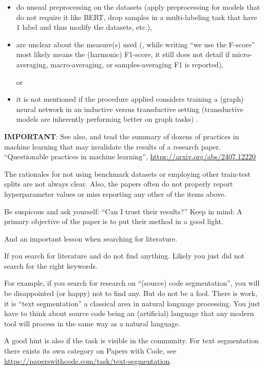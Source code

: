 \documentclass[manuscript, nonacm]{acmart}
\begin{document}
\begin{tcolorbox}[title=Instructions]
\begin{itemize}
\item do unsual preprocessing on the datasets (\eg apply preprocessing for models that do not require it like BERT, drop samples in a multi-labeling task that have $1$ label and thus modify the datasets, etc.),
%

\item are unclear about the measure(s) used (\eg, while writing ``we use the F-score'' most likely means the (harmonic) F1-score, it still does not detail if micro-averaging, macro-averaging, or samples-averaging F1 is reported),
%

or

\item it is not mentioned if the procedure applied considers training a (graph) neural network in an inductive versus transductive setting (transductive models are inherently performing better on graph tasks)
%
.


\end{itemize}

\textbf{IMPORTANT}: See also, and tead the summary of dozens of practices in machine learning that may invalidate the results of a research paper.
%
``Questionable practices in machine learning'', \url{https://arxiv.org/abs/2407.12220}

\end{tcolorbox}

The rationales for not using benchmark datasets or employing other train-test splits are not always clear.
Also, the papers often do not properly report hyperparameter values or miss reporting any other of the items above.

\begin{tcolorbox}[title=As a general rule when reading related work]

Be suspicous and ask yourself: ``Can I trust their results?''
Keep in mind: A primary objective of the paper is to put their method in a good light.
\end{tcolorbox}

And an important lesson when searching for literature.

\begin{tcolorbox}[title=Lesson learned (once) again!]
If you search for literature and do not find anything. Likely you just did not search for the right keywords.

For example, if you search for research on ``(source) code segmentation'', you will be disappointed (or happy) not to find any.
But do not be a fool. 
There is work, it is ``text segmentation'' a classical area in natural language processing.
You just have to think about source code being an (artificial) language that any modern tool will process in the same way as a natural language.

A good hint is also if the task is visible in the community.
For text segmentation there exists its own category on Papers with Code, see \url{https://paperswithcode.com/task/text-segmentation}.
\end{tcolorbox}
\end{document}
